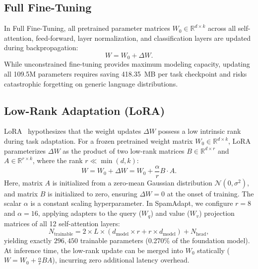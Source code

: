 \documentclass[conference]{IEEEtran}
\begin{document}
\subsection{Full Fine-Tuning}
In Full Fine-Tuning, all pretrained parameter matrices $W_0 \in \mathbb{R}^{d \times k}$ across all self-attention, feed-forward, layer normalization, and classification layers are updated during backpropagation:
\begin{equation}
    W = W_0 + \Delta W.
    \label{eq:full_ft}
\end{equation}
While unconstrained fine-tuning provides maximum modeling capacity, updating all 109.5M parameters requires saving 418.35~MB per task checkpoint and risks catastrophic forgetting on generic language distributions.

\subsection{Low-Rank Adaptation (LoRA)}
LoRA~\cite{hu2022lora} hypothesizes that the weight updates $\Delta W$ possess a low intrinsic rank during task adaptation. For a frozen pretrained weight matrix $W_0 \in \mathbb{R}^{d \times k}$, LoRA parameterizes $\Delta W$ as the product of two low-rank matrices $B \in \mathbb{R}^{d \times r}$ and $A \in \mathbb{R}^{r \times k}$, where the rank $r \ll \min(d, k)$:
\begin{equation}
    W = W_0 + \Delta W = W_0 + \frac{\alpha}{r} B \cdot A.
    \label{eq:lora}
\end{equation}
Here, matrix $A$ is initialized from a zero-mean Gaussian distribution $\mathcal{N}(0, \sigma^2)$, and matrix $B$ is initialized to zero, ensuring $\Delta W = 0$ at the onset of training. The scalar $\alpha$ is a constant scaling hyperparameter. In SpamAdapt, we configure $r = 8$ and $\alpha = 16$, applying adapters to the query ($W_q$) and value ($W_v$) projection matrices of all 12 self-attention layers:
\begin{equation}
    N_{\text{trainable}} = 2 \times L \times (d_{\text{model}} \times r + r \times d_{\text{model}}) + N_{\text{head}},
\end{equation}
yielding exactly $296,450$ trainable parameters (0.270\% of the foundation model). At inference time, the low-rank update can be merged into $W_0$ statically ($W = W_0 + \frac{\alpha}{r}BA$), incurring zero additional latency overhead.
\end{document}
